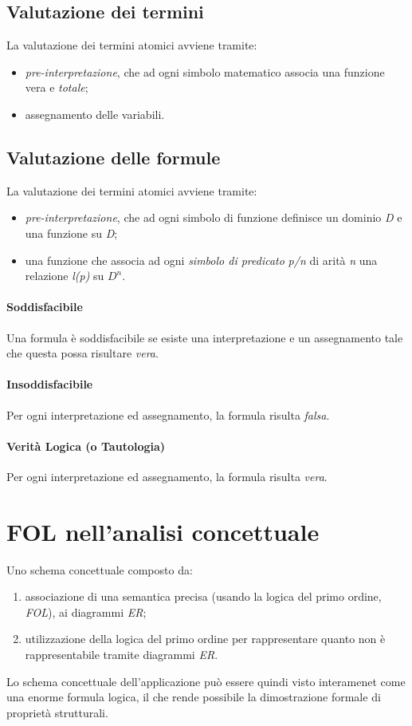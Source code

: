 \subsection{Valutazione dei termini}
La valutazione dei termini atomici avviene tramite:
\begin{itemize}
	\item \textit{pre-interpretazione}, che ad ogni simbolo matematico associa una funzione vera e \textit{totale};
	\item assegnamento delle variabili.
\end{itemize}

\subsection{Valutazione delle formule}
La valutazione dei termini atomici avviene tramite:
\begin{itemize}
	\item \textit{pre-interpretazione}, che ad ogni simbolo di funzione definisce un dominio \textit{D} e una funzione su \textit{D};
	\item una funzione che associa ad ogni \textit{simbolo di predicato} \textit{p/n} di arità \textit{n} una relazione \textit{l(p)} su $D^n$.
\end{itemize}

\paragraph{Soddisfacibile}
Una formula è soddisfacibile se esiste una interpretazione e un assegnamento tale che questa possa risultare \textit{vera}.
\paragraph{Insoddisfacibile}
Per ogni interpretazione ed assegnamento, la formula risulta \textit{falsa}.
\paragraph{Verità Logica (o Tautologia)}
Per ogni interpretazione ed assegnamento, la formula risulta \textit{vera}.

\section{FOL nell'analisi concettuale}
Uno schema concettuale composto da:
\begin{enumerate}
	\item associazione di una semantica precisa (usando la logica del primo ordine, \textit{FOL}), ai diagrammi \textit{ER};
	\item utilizzazione della logica del primo ordine per rappresentare quanto non è rappresentabile tramite diagrammi \textit{ER}.
\end{enumerate}
Lo schema concettuale dell'applicazione può essere quindi visto interamenet come una enorme formula logica, il che rende possibile la dimostrazione formale di proprietà strutturali.
\newpage

